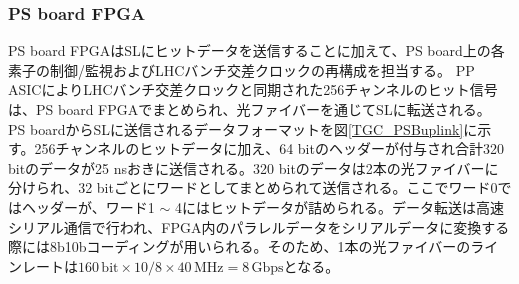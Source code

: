     \subsubsection*{PS board FPGA}

    PS board FPGAはSLにヒットデータを送信することに加えて、PS board上の各素子の制御/監視およびLHCバンチ交差クロックの再構成を担当する。
    PP ASICによりLHCバンチ交差クロックと同期された256チャンネルのヒット信号は、PS board FPGAでまとめられ、光ファイバーを通じてSLに転送される。
    PS boardからSLに送信されるデータフォーマットを図\ref{TGC_PSBuplink}に示す。256チャンネルのヒットデータに加え、64 bitのヘッダーが付与され合計320 bitのデータが25 nsおきに送信される。320 bitのデータは2本の光ファイバーに分けられ、32 bitごとにワードとしてまとめられて送信される。ここでワード0ではヘッダーが、ワード1 $\sim$ 4にはヒットデータが詰められる。データ転送は高速シリアル通信で行われ、FPGA内のパラレルデータをシリアルデータに変換する際には8b10bコーディングが用いられる。そのため、1本の光ファイバーのラインレートは$160 \, \mathrm{bit} \times 10/8 \times 40 \mathrm{\,MHz} = 8 \,\mathrm{Gbps}$となる。


